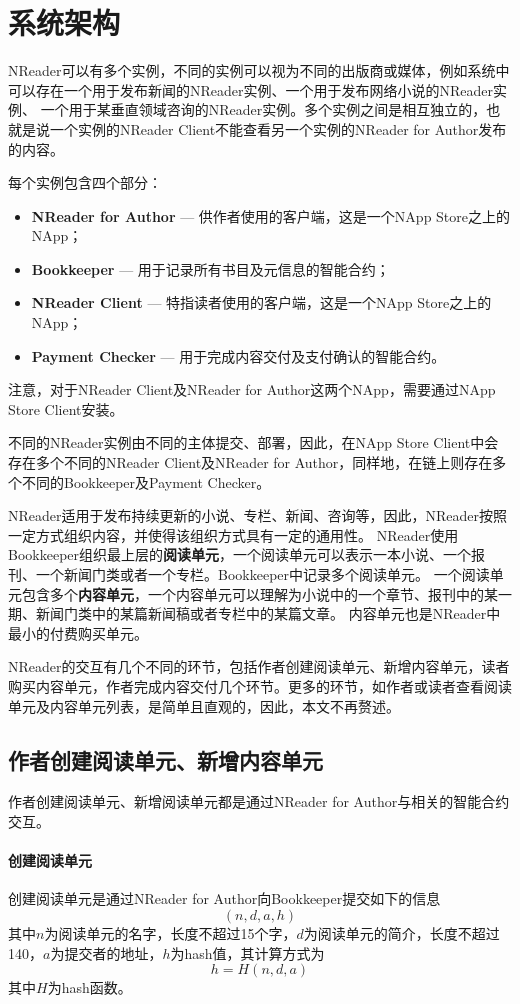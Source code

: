 \section{系统架构}

NReader可以有多个实例，不同的实例可以视为不同的出版商或媒体，例如系统中可以存在一个用于发布新闻的NReader实例、一个用于发布网络小说的NReader实例、
一个用于某垂直领域咨询的NReader实例。多个实例之间是相互独立的，也就是说一个实例的NReader Client不能查看另一个实例的NReader for Author发布的内容。

每个实例包含四个部分：
\begin{itemize}
\item \textbf{NReader for Author} --- 供作者使用的客户端，这是一个NApp Store之上的NApp；
\item \textbf{Bookkeeper} --- 用于记录所有书目及元信息的智能合约；
\item \textbf{NReader Client} --- 特指读者使用的客户端，这是一个NApp Store之上的NApp；
\item \textbf{Payment Checker} --- 用于完成内容交付及支付确认的智能合约。 
\end{itemize}
\noindent 注意，对于NReader Client及NReader for Author这两个NApp，需要通过NApp Store Client安装。

不同的NReader实例由不同的主体提交、部署，因此，在NApp Store Client中会存在多个不同的NReader Client及NReader for Author，同样地，在链上则存在多个不同的Bookkeeper及Payment Checker。

NReader适用于发布持续更新的小说、专栏、新闻、咨询等，因此，NReader按照一定方式组织内容，并使得该组织方式具有一定的通用性。
NReader使用Bookkeeper组织最上层的\textbf{阅读单元}，一个阅读单元可以表示一本小说、一个报刊、一个新闻门类或者一个专栏。Bookkeeper中记录多个阅读单元。
一个阅读单元包含多个\textbf{内容单元}，一个内容单元可以理解为小说中的一个章节、报刊中的某一期、新闻门类中的某篇新闻稿或者专栏中的某篇文章。
内容单元也是NReader中最小的付费购买单元。

NReader的交互有几个不同的环节，包括作者创建阅读单元、新增内容单元，读者购买内容单元，作者完成内容交付几个环节。更多的环节，如作者或读者查看阅读单元及内容单元列表，是简单且直观的，因此，本文不再赘述。

\subsection{作者创建阅读单元、新增内容单元}
作者创建阅读单元、新增阅读单元都是通过NReader for Author与相关的智能合约交互。

\paragraph{创建阅读单元}
创建阅读单元是通过NReader for Author向Bookkeeper提交如下的信息
\[
(n, d, a, h)
\]
\noindent 其中\(n\)为阅读单元的名字，长度不超过15个字，\(d\)为阅读单元的简介，长度不超过140，\(a\)为提交者的地址，\(h\)为hash值，其计算方式为
\[h = H(n, d, a)\]
\noindent 其中\(H\)为hash函数。

